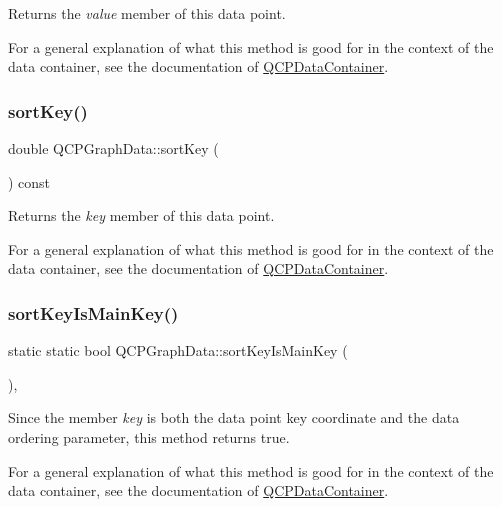 Returns the {\itshape value} member of this data point.

For a general explanation of what this method is good for in the context of the data container, see the documentation of \hyperlink{class_q_c_p_data_container}{Q\+C\+P\+Data\+Container}. \mbox{\label{class_q_c_p_graph_data_a5e0f37ea101eeec245d8c32a2206b204}} 
\subsubsection{\texorpdfstring{sort\+Key()}{sortKey()}}
{\footnotesize\ttfamily double Q\+C\+P\+Graph\+Data\+::sort\+Key (\begin{DoxyParamCaption}{ }\end{DoxyParamCaption}) const\hspace{0.3cm}{\ttfamily [inline]}}

Returns the {\itshape key} member of this data point.

For a general explanation of what this method is good for in the context of the data container, see the documentation of \hyperlink{class_q_c_p_data_container}{Q\+C\+P\+Data\+Container}. \mbox{\label{class_q_c_p_graph_data_a1c98dfd21b82321a173db4ff860dfd21}} 
\subsubsection{\texorpdfstring{sort\+Key\+Is\+Main\+Key()}{sortKeyIsMainKey()}}
{\footnotesize\ttfamily static static bool Q\+C\+P\+Graph\+Data\+::sort\+Key\+Is\+Main\+Key (\begin{DoxyParamCaption}{ }\end{DoxyParamCaption})\hspace{0.3cm}{\ttfamily [inline]}, {\ttfamily [static]}}

Since the member {\itshape key} is both the data point key coordinate and the data ordering parameter, this method returns true.

For a general explanation of what this method is good for in the context of the data container, see the documentation of \hyperlink{class_q_c_p_data_container}{Q\+C\+P\+Data\+Container}. \mbox{\label{class_q_c_p_graph_data_a2f8dd30360356f66cc418a170a9f3792}} 
